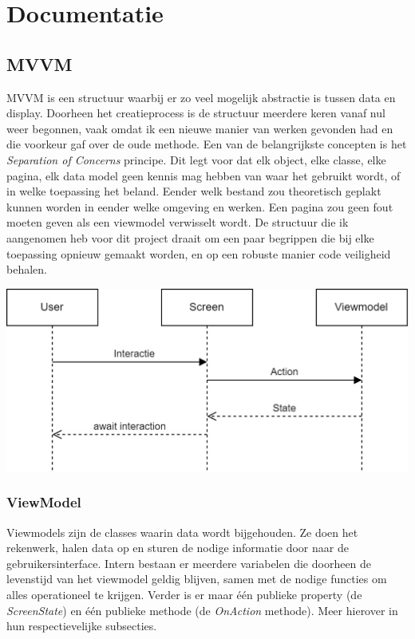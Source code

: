 \documentclass{report}
\begin{document}
\chapter{Documentatie}
\section{MVVM}
MVVM is een structuur waarbij er zo veel mogelijk abstractie is tussen data en display. 
Doorheen het creatieprocess is de structuur meerdere keren vanaf nul weer begonnen, vaak omdat ik een nieuwe manier van werken gevonden had en die voorkeur gaf over de oude methode.
Een van de belangrijkste concepten is het \textit{Separation of Concerns} principe. Dit legt voor dat elk object, elke classe, elke pagina, elk data model geen kennis mag hebben van waar het gebruikt wordt, of in welke toepassing het beland.
Eender welk bestand zou theoretisch geplakt kunnen worden in eender welke omgeving en werken. Een pagina zou geen fout moeten geven als een viewmodel verwisselt wordt.
De structuur die ik aangenomen heb voor dit project draait om een paar begrippen die bij elke toepassing opnieuw gemaakt worden, en op een robuste manier code veiligheid behalen.

\begin{center}
    \includegraphics[scale=0.5]{MVVM_Overzicht}
\end{center}

\subsection{ViewModel}
Viewmodels zijn de classes waarin data wordt bijgehouden. Ze doen het rekenwerk, halen data op en sturen de nodige informatie door naar de gebruikersinterface.
Intern bestaan er meerdere variabelen die doorheen de levenstijd van het viewmodel geldig blijven, samen met de nodige functies om alles operationeel te krijgen.
Verder is er maar één publieke property (de \textit{ScreenState}) en één publieke methode (de \textit{OnAction} methode). Meer hierover in hun respectievelijke subsecties.
\end{document}
